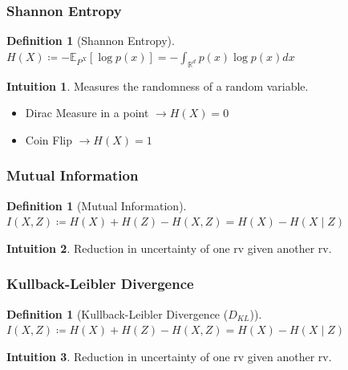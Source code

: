 \documentclass{beamer}
\newcommand{\R}{\mathbb{R}}
\theoremstyle{definition}
\newtheorem{definition}[section]{Definition}
\newtheorem{intuition}{Intuition}
\begin{document}
    \begin{frame}
      \frametitle{Shannon Entropy}
      \begin{definition}[Shannon Entropy]
        $H(X) \coloneqq -\mathbb{E}_{P^{X}}[\log p(x)] = -\int_{\R^{d}}p(x) \log p(x) dx$
      \end{definition}
      \begin{intuition}
       Measures the randomness of a random variable.
     \end{intuition}
     \begin{example}
       \begin{itemize}
         \item Dirac Measure in a point $\rightarrow H(X) = 0$
               \item Coin Flip $\rightarrow H(X) = 1$
       \end{itemize}
     \end{example}
    \end{frame}


    \begin{frame}
      \frametitle{Mutual Information}
      \begin{definition}[Mutual Information]
        $I(X, Z) \coloneqq H(X) + H(Z) - H(X, Z) = H(X) - H(X \mid Z)$
      \end{definition}
      \begin{intuition}
        Reduction in uncertainty of one rv given another rv.
      \end{intuition}
    \end{frame}

    \begin{frame}
      \frametitle{Kullback-Leibler Divergence}
      \begin{definition}[Kullback-Leibler Divergence ($D_{KL}$)]
        $I(X, Z) \coloneqq H(X) + H(Z) - H(X, Z) = H(X) - H(X \mid Z)$
      \end{definition}
      \begin{intuition}
        Reduction in uncertainty of one rv given another rv.
      \end{intuition}
    \end{frame}
\end{document}
